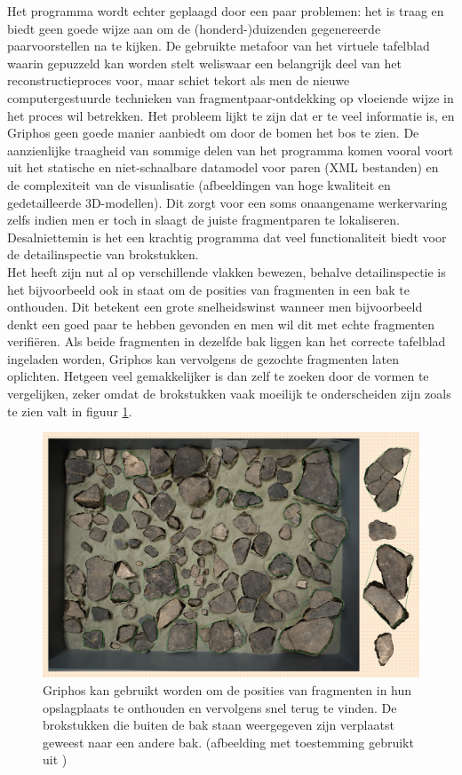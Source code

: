 Het programma wordt echter geplaagd door een paar problemen: het is traag en biedt geen goede wijze aan om de (honderd-)duizenden gegenereerde paarvoorstellen na te kijken. De gebruikte metafoor van het virtuele tafelblad waarin gepuzzeld kan worden stelt weliswaar een belangrijk deel van het reconstructieproces voor, maar schiet tekort als men de nieuwe computergestuurde technieken van fragmentpaar-ontdekking op vloeiende wijze in het proces wil betrekken. Het probleem lijkt te zijn dat er te veel informatie is, en Griphos geen goede manier aanbiedt om door de bomen het bos te zien. De aanzienlijke traagheid van sommige delen van het programma komen vooral voort uit het statische en niet-schaalbare datamodel voor paren (XML bestanden) en de complexiteit van de visualisatie (afbeeldingen van hoge kwaliteit en gedetailleerde 3D-modellen). Dit zorgt voor een soms onaangename werkervaring zelfs indien men er toch in slaagt de juiste fragmentparen te lokaliseren. Desalniettemin is het een krachtig programma dat veel functionaliteit biedt voor de detailinspectie van brokstukken.\\

Het heeft zijn nut al op verschillende vlakken bewezen, behalve detailinspectie is het bijvoorbeeld ook in staat om de posities van fragmenten in een bak te onthouden. Dit betekent een grote snelheidswinst wanneer men bijvoorbeeld denkt een goed paar te hebben gevonden en men wil dit met echte fragmenten verifi\"eren. Als beide fragmenten in dezelfde bak liggen kan het correcte tafelblad ingeladen worden, Griphos kan vervolgens de gezochte fragmenten laten oplichten. Hetgeen veel gemakkelijker is dan zelf te zoeken door de vormen te vergelijken, zeker omdat de brokstukken vaak moeilijk te onderscheiden zijn zoals te zien valt in figuur \ref{fig:griphosbak}. 

\begin{figure}[ht]
	\begin{center}
		\includegraphics[width=.8\columnwidth]{images/griphos-bak-01.png}
		\caption{Griphos kan gebruikt worden om de posities van fragmenten in hun opslagplaats te onthouden en vervolgens snel terug te vinden. De brokstukken die buiten de bak staan weergegeven zijn verplaatst geweest naar een andere bak. (afbeelding met toestemming gebruikt uit \cite{Brown2011})}
		\label{fig:griphosbak}
	\end{center}
\end{figure}

